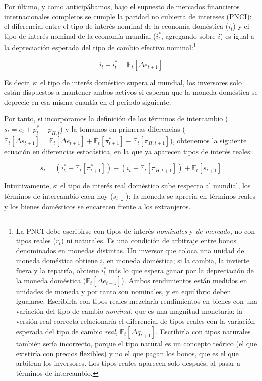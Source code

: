 \documentclass[10pt,a4paper]{article}
\begin{document}
Por último, y como anticipábamos, bajo el supuesto de mercados financieros internacionales completos se cumple la paridad no cubierta de intereses (PNCI): el diferencial entre el tipo de interés nominal de la economía doméstica ($i_t$) y el tipo de interés nominal de la economía mundial ($i_t^*$, agregando sobre $i$) es igual a la depreciación esperada del tipo de cambio efectivo nominal:\footnote{%
La PNCI debe escribirse con tipos de interés \textit{nominales} y \textit{de mercado}, no con tipos reales ($r_t$) ni naturales. Es una condición de arbitraje entre bonos denominados en monedas distintas. Un inversor que coloca una unidad de moneda doméstica obtiene $i_t$ en moneda doméstica; si la cambia, la invierte fuera y la repatría, obtiene $i_t^*$ más lo que espera ganar por la depreciación de la moneda doméstica ($\mathbb E_t[\Delta e_{t+1}]$). Ambos rendimientos están medidos en unidades de moneda y por tanto son nominales, y en equilibrio deben igualarse. Escribirla con tipos reales mezclaría rendimientos en bienes con una variación del tipo de cambio \textit{nominal}, que es una magnitud monetaria: la versión real correcta relacionaría el diferencial de tipos reales con la variación esperada del tipo de cambio \textit{real}, $\mathbb E_t[\Delta q_{t+1}]$. Escribirla con tipos naturales también sería incorrecto, porque el tipo natural es un concepto teórico (el que existiría con precios flexibles) y no el que pagan los bonos, que es el que arbitran los inversores. Los tipos reales aparecen solo después, al pasar a términos de intercambio.
%
}

$$i_t-i_t^*=\mathbb E_t[\Delta e_{t+1}]$$

Es decir, si el tipo de interés doméstico supera al mundial, los inversores solo están dispuestos a mantener ambos activos si esperan que la moneda doméstica se deprecie en esa misma cuantía en el periodo siguiente.

Por tanto, si incorporamos la definición de los términos de intercambio ($s_t=e_t+p_t^*-p_{H,t}$) y la tomamos en primeras diferencias ($\mathbb E_t[\Delta s_{t+1}]=\mathbb E_t[\Delta e_{t+1}]+\mathbb E_t[\pi_{t+1}^*]-\mathbb E_t[\pi_{H,t+1}]$), obtenemos la siguiente ecuación en diferencias estocástica, en la que ya aparecen tipos de interés reales:

$$s_t= (i_t^*-\mathbb E_t[\pi_{t+1}^*])-(i_t-\mathbb E_t[\pi_{H,t+1}])+\mathbb E_t[s_{t+1}]$$

Intuitivamente, si el tipo de interés real doméstico sube respecto al mundial, los términos de intercambio caen hoy ($s_t\downarrow$): la moneda se aprecia en términos reales y los bienes domésticos se encarecen frente a los extranjeros.
\end{document}
